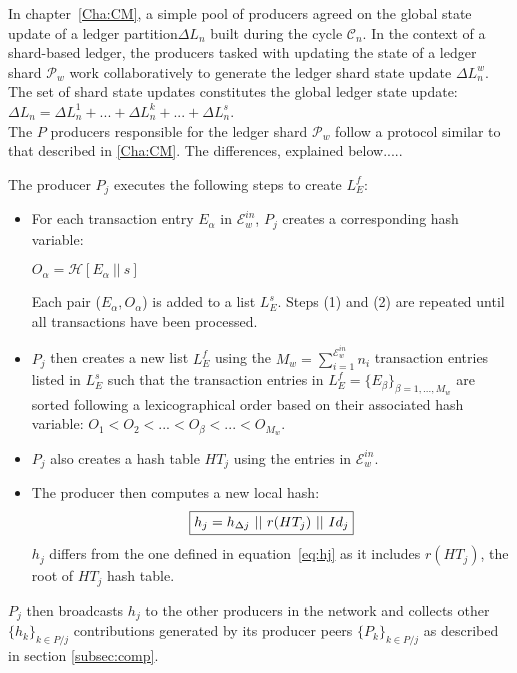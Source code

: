 In chapter~\ref{Cha:CM}, a simple pool of producers agreed on the global state update of a ledger partition$\Delta L_n$ built during the cycle $\mathcal{C}_{n}$. In the context of a shard-based ledger, the producers tasked with updating the state of a ledger shard $\mathcal{P}_w$ work collaboratively to generate the ledger shard state update $\Delta L^w_n$. The set of shard state updates constitutes the global ledger state update: $\Delta L_n = \Delta L^1_n + ... + \Delta L^k_n + ...+ \Delta L^s_n$.\\ 

The $P$ producers responsible for the ledger shard $\mathcal{P}_w$ follow a protocol similar to that described in \ref{Cha:CM}. The differences, explained below.....

The producer $P_j$ executes the following steps to create $L_E^f$:
\begin{itemize}
\item For each transaction entry $E_\alpha$ in $\mathcal{E}^{in}_w$, $P_j$ creates a corresponding hash variable: 
\begin{center}
$O_\alpha = \mathcal{H}[E_\alpha~||~s]$
\end{center}
Each pair ($E_\alpha,O_\alpha$) is added to a list $L^s_E$. Steps (1) and (2) are repeated until all transactions have been processed.
\item	$P_j$ then creates a new list $L^f_E$ using the $M_w=\sum_{i=1}^{\mathcal{E}^{in}_w}n_i$ transaction entries listed in $L^s_E$ such that the transaction entries in $L^f_E = \{E_\beta\}_{\beta=1,...,M_w}$ are sorted following a lexicographical order based on their associated hash variable: $O_1 < O_2 < ... < O_\beta < ... < O_{M_w}$. 
\item $P_j$ also creates a hash table $HT_j$ using the entries in $\mathcal{E}^{in}_w$.
\item The producer then computes a new local hash:
\begin{equation}
\label{eq:hj_shard}
\fbox{$h_j = h_{\Delta j}~||~r(HT_j)~||~Id_j$}
\end{equation}
$h_j$ differs from the one defined in equation~\ref{eq:hj} as it includes $r(HT_j)$, the root of $HT_j$ hash table.
\end{itemize}
$P_j$ then broadcasts $h_j$ to the other producers in the network and collects other $\{h_k\}_{k \in P/j}$ contributions generated by its producer peers $\{P_k\}_{k \in P/j}$ as described in section \ref{subsec:comp}.\\

